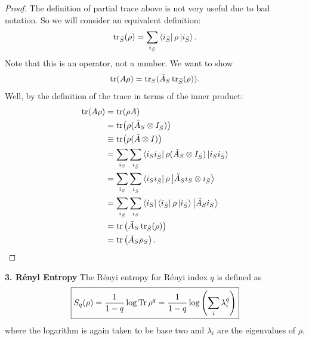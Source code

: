 \documentclass{book}
\theoremstyle{definition}
\newcommand{\nn}{\nonumber}
\newcommand{\f}[2]{\frac{#1}{#2}}
\newcommand{\lp}{\left(}
\newcommand{\rp}{\right)}
\begin{document}
\begin{proof}     
	The definition of partial trace above is not very useful due to bad notation. So we will consider an equivalent definition:
	\begin{align}
	\tr_{\bar{S}}(\rho) = \sum_{i_{\bar{S}}} \bra{i_{\bar{S}}}\rho\ket{i_{\bar{S}}}. 
	\end{align}
	Note that this is an operator, not a number.  We want to show
	\begin{align}
	\tr(A\rho) = \tr_S(\tilde{A}_S \tr_{\bar{S}}(\rho)).
	\end{align}
	Well, by the definition of the trace in terms of the inner product:
	\begin{align}
	\tr(A\rho) &= \tr(\rho A) \nn\\
	&= \tr(\rho(\tilde{A}_S \otimes I_{\bar{S}}) )\nn\\
	&\equiv \tr(\rho (\tilde{A} \otimes I))\nn\\
	&=  \sum_{i_{S}} \sum_{i_{\bar{S}}}\bra{i_{S} i_{\bar{S}}} \rho (\tilde{A}_S \otimes I_{\bar{S}})   \ket{i_{S} i_{\bar{S}}}\nn\\
	&= \sum_{i_{S}} \sum_{i_{\bar{S}}}\bra{i_{S} i_{\bar{S}}} \rho \ket{\tilde{A}_S i_S \otimes  i_{\bar{S}}}\nn\\
	&= \sum_{i_{\bar{S}}}\sum_{i_{S}}  \bra{i_{{S}}}  \bra{i_{\bar{S}}} \rho \ket{i_{\bar{S}}}  \ket{\tilde{A}_S i_S} \nn\\
	&= \tr\lp \tilde{A}_S \tr_{\bar{S}} (\rho) \rp\nn\\
	&= \tr\lp \tilde{A}_S \rho_S \rp.
	\end{align}
	
\end{proof}


\noindent \textbf{3. R\'enyl Entropy} The R\'enyi entropy for R\'enyi index $q$ is defined as
\begin{align}
\boxed{S_q(\rho) = \f{1}{1-q}\log \Tr \rho^q = \f{1}{1-q} \log \lp \sum_i \lambda_i^q \rp}
\end{align} 
where the logarithm is again taken to be base two and $\lambda_i$ are the eigenvalues of $\rho$.
\end{document}
